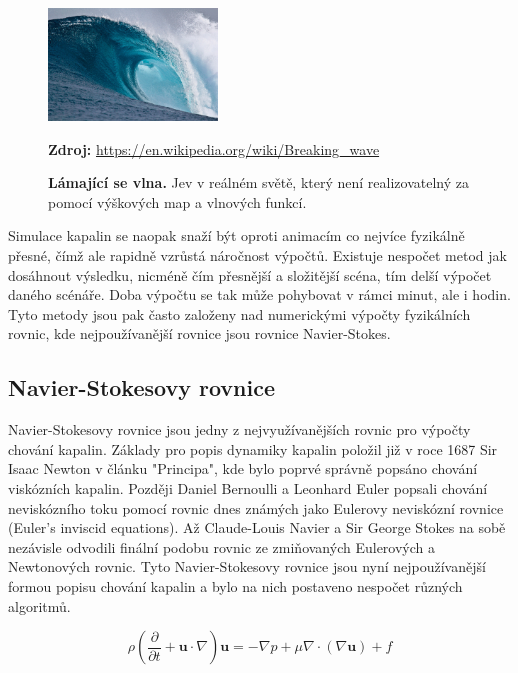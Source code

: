 \begin{figure}[hbt]
	\centering
	\captionsetup{justification=centering}
	\includegraphics[width=0.4\textwidth]{obrazky-figures/Large_breaking_wave.jpg}
	\caption{\textbf{Lámající se vlna.} Jev v reálném světě, který není realizovatelný za pomocí výškových map a vlnových funkcí.}
	\textbf{Zdroj: } \url{https://en.wikipedia.org/wiki/Breaking_wave}
	\label{keepCalm}
\end{figure}

Simulace kapalin se naopak snaží být oproti animacím co nejvíce fyzikálně přesné, čímž ale rapidně vzrůstá náročnost výpočtů. Existuje nespočet metod jak dosáhnout výsledku, nicméně čím přesnější a složitější scéna, tím delší výpočet daného scénáře. Doba výpočtu se tak může pohybovat v rámci minut, ale i hodin. Tyto metody jsou pak často založeny nad numerickými výpočty fyzikálních rovnic, kde nejpoužívanější rovnice jsou rovnice Navier-Stokes.

\subsection{Navier-Stokesovy rovnice}
Navier-Stokesovy rovnice jsou jedny z nejvyužívanějších rovnic pro výpočty chování kapalin. Základy pro popis dynamiky kapalin položil již v roce 1687 Sir Isaac Newton v článku "Principa", kde bylo poprvé správně popsáno chování viskózních kapalin. Později Daniel Bernoulli a Leonhard Euler popsali chování neviskózního toku pomocí rovnic dnes známých jako Eulerovy neviskózní rovnice (Euler’s inviscid equations). Až Claude-Louis Navier a Sir George Stokes na sobě nezávisle odvodili finální podobu rovnic ze zmiňovaných Eulerových a Newtonových rovnic. Tyto Navier-Stokesovy rovnice jsou nyní nejpoužívanější formou popisu chování kapalin a bylo na nich postaveno nespočet různých algoritmů. \cite{simscale_2020}

\begin{equation}
	\rho(\frac{\partial}{\partial t} + \mathbf{u} \cdot \nabla)\mathbf{u} = -\nabla p + \mu\nabla\cdot(\nabla \mathbf{u}) + f 
	\label{eq:NavierStokes}
\end{equation}

